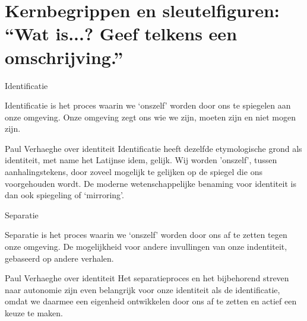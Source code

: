 \documentclass[main.tex]{subfiles}
\begin{document}
\section{Kernbegrippen en sleutelfiguren: ``Wat is...? Geef telkens een omschrijving.''}


\begin{examenvraag}
    \begin{vraag}
        Identificatie
    \end{vraag}

    \begin{antwoord}
        Identificatie is het proces waarin we `onszelf' worden door ons te spiegelen aan onze omgeving. Onze omgeving zegt ons wie we zijn, moeten zijn en niet mogen zijn.
        \begin{citaat}{Paul Verhaeghe over identiteit}
            Identificatie heeft dezelfde etymologische grond als identiteit, met name het Latijnse idem, gelijk.
            Wij worden 'onszelf', tussen aanhalingstekens, door zoveel mogelijk te gelijken op de spiegel die ons voorgehouden wordt.
            De moderne wetenschappelijke benaming voor identiteit is dan ook spiegeling of `mirroring'.
        \end{citaat}
    \end{antwoord}
\end{examenvraag}


\begin{examenvraag}
    \begin{vraag}
        Separatie
    \end{vraag}

    \begin{antwoord}
        Separatie is het proces waarin we `onszelf' worden door ons af te zetten tegen onze omgeving. De mogelijkheid voor andere invullingen van onze indentiteit, gebaseerd op andere verhalen.
        \begin{citaat}{Paul Verhaeghe over identiteit}                                     
            Het separatieproces en het bijbehorend streven naar autonomie zijn even belangrijk voor onze identiteit als de identificatie, omdat we daarmee een eigenheid ontwikkelen door ons af te zetten en actief een keuze te maken.                                                     
        \end{citaat} 
    \end{antwoord}
\end{examenvraag}
\end{document}
